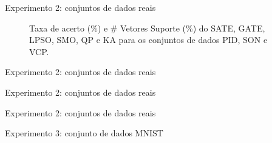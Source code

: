 \documentclass{beamer}
\newcommand\infe{\textcolor{gray}{\ding{55}}}
\newcommand\equi{\ding{51}}
\newcommand{\tabela}[3]{
\begin{table}[!htbp]
  \scalefont{#3}
  \begin{center}
  \caption{#2}\label{tab:#1}
    
  \end{center}
\end{table}
}
\begin{document}
\begin{frame}[noframenumbering]{Experimento 2: conjuntos de dados reais}
  \begin{figure}[!htbp]
    \centering
    \caption{Taxa de acerto (\%) e \# Vetores Suporte (\%) do SATE, GATE, LPSO, SMO, QP e KA para os conjuntos de dados PID, SON e VCP.}\label{fig:accuracy_training_patterns}
  \end{figure}
\end{frame}

\begin{frame}[noframenumbering]{Experimento 2: conjuntos de dados reais}
\end{frame}

\begin{frame}[noframenumbering]{Experimento 2: conjuntos de dados reais}
  \vspace{5em}
\end{frame}

\begin{frame}[noframenumbering]{Experimento 2: conjuntos de dados reais}
\end{frame}

\begin{frame}{Experimento 3: conjunto de dados MNIST}
\end{frame}
\end{document}

